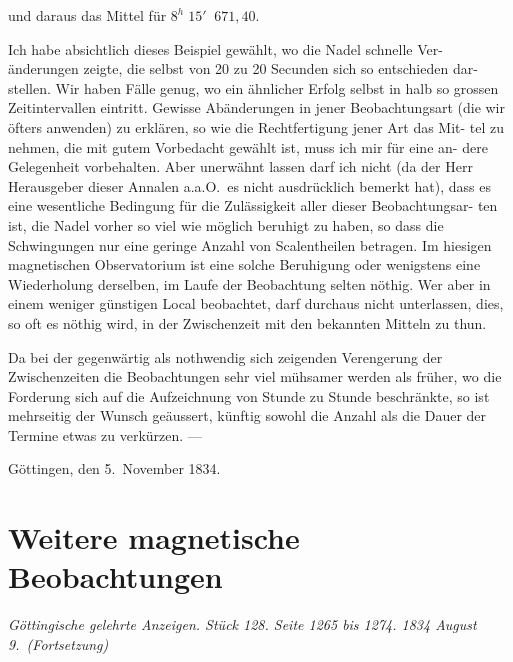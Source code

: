 \documentclass[12pt,a4paper]{article}
\begin{document}
und daraus das Mittel für $8^h\;15'\;\;671{,}40$.

Ich habe absichtlich dieses Beispiel gewählt, wo die Nadel schnelle Ver-
änderungen zeigte, die selbst von 20 zu 20 Secunden sich so entschieden dar-
stellen. Wir haben Fälle genug, wo ein ähnlicher Erfolg selbst in halb so grossen 
Zeitintervallen eintritt. Gewisse Abänderungen in jener Beobachtungsart (die 
wir öfters anwenden) zu erklären, so wie die Rechtfertigung jener Art das Mit-
tel zu nehmen, die mit gutem Vorbedacht gewählt ist, muss ich mir für eine an-
dere Gelegenheit vorbehalten. Aber unerwähnt lassen darf ich nicht (da der 
Herr Herausgeber dieser Annalen a.a.O.\ es nicht ausdrücklich bemerkt hat), dass 
es eine wesentliche Bedingung für die Zulässigkeit aller dieser Beobachtungsar-
ten ist, die Nadel vorher so viel wie möglich beruhigt zu haben, so dass die 
Schwingungen nur eine geringe Anzahl von Scalentheilen betragen. Im hiesigen 
magnetischen Observatorium ist eine solche Beruhigung oder wenigstens eine 
Wiederholung derselben, im Laufe der Beobachtung selten nöthig. Wer aber 
in einem weniger günstigen Local beobachtet, darf durchaus nicht unterlassen, 
dies, so oft es nöthig wird, in der Zwischenzeit mit den bekannten Mitteln zu thun.

Da bei der gegenwärtig als nothwendig sich zeigenden Verengerung der 
Zwischenzeiten die Beobachtungen sehr viel mühsamer werden als früher, wo die 
Forderung sich auf die Aufzeichnung von Stunde zu Stunde beschränkte, so ist 
mehrseitig der Wunsch geäussert, künftig sowohl die Anzahl als die Dauer der 
Termine etwas zu verkürzen. ---

\begin{flushright}
Göttingen, den 5.\ November 1834.
\end{flushright}

\newpage
\section*{Weitere magnetische Beobachtungen}

\textit{Göttingische gelehrte Anzeigen. Stück 128. Seite 1265 bis 1274. 1834 August 9.\ (Fortsetzung)}
\end{document}
